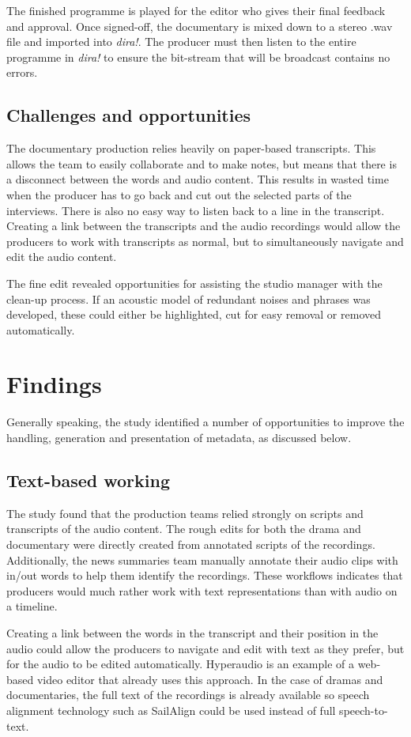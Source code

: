 The finished programme is played for the editor who gives their final feedback
and approval.  Once signed-off, the documentary is mixed down to a stereo .wav
file and imported into \textit{dira!}. The producer must then listen to the
entire programme in \textit{dira!} to ensure the bit-stream that will be
broadcast contains no errors.

\subsection{Challenges and opportunities}
The documentary production relies heavily on paper-based transcripts. This
allows the team to easily collaborate and to make notes, but means that there
is a disconnect between the words and audio content. This results in wasted
time when the producer has to go back and cut out the selected parts of the
interviews. There is also no easy way to listen back to a line in the
transcript. Creating a link between the transcripts and the audio recordings
would allow the producers to work with transcripts as normal, but to
simultaneously navigate and edit the audio content.

The fine edit revealed opportunities for assisting the studio manager with the
clean-up process. If an acoustic model of redundant noises and phrases was 
developed, these could either be highlighted, cut for easy removal or removed
automatically.

\section{Findings}\label{sec:summary}
Generally speaking, the study identified a number of opportunities to improve
the handling, generation and presentation of metadata, as discussed below.

\subsection{Text-based working}
The study found that the production teams relied strongly on scripts and
transcripts of the audio content. The rough edits for both the drama and
documentary were directly created from annotated scripts of the recordings.
Additionally, the news summaries team manually annotate their audio clips with
in/out words to help them identify the recordings. These workflows indicates
that producers would much rather work with text representations than with audio
on a timeline.

Creating a link between the words in the transcript and their position in the
audio could allow the producers to navigate and edit with text as they prefer,
but for the audio to be edited automatically. Hyperaudio \citep{Boas2012} is an
example of a web-based video editor that already uses this approach. In the
case of dramas and documentaries, the full text of the recordings is already
available so speech alignment technology such as SailAlign
\citep{Katsamanis2011} could be used instead of full speech-to-text.

